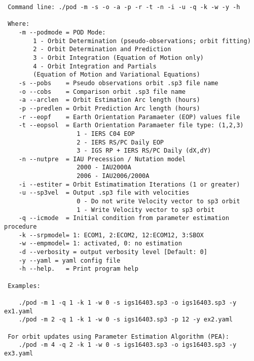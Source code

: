 \begin{verbatim}
 Command line: ./pod -m -s -o -a -p -r -t -n -i -u -q -k -w -y -h

 Where:
    -m --podmode = POD Mode:
        1 - Orbit Determination (pseudo-observations; orbit fitting)
        2 - Orbit Determination and Prediction
        3 - Orbit Integration (Equation of Motion only)
        4 - Orbit Integration and Partials 
        (Equation of Motion and Variational Equations)
    -s --pobs    = Pseudo observations orbit .sp3 file name
    -o --cobs    = Comparison orbit .sp3 file name
    -a --arclen  = Orbit Estimation Arc length (hours)
    -p --predlen = Orbit Prediction Arc length (hours)
    -r --eopf    = Earth Orientation Paramaeter (EOP) values file
    -t --eopsol  = Earth Orientation Paramaeter file type: (1,2,3)
                    1 - IERS C04 EOP
                    2 - IERS RS/PC Daily EOP
                    3 - IGS RP + IERS RS/PC Daily (dX,dY)
    -n --nutpre  = IAU Precession / Nutation model
                    2000 - IAU2000A
                    2006 - IAU2006/2000A
    -i --estiter = Orbit Estimatimation Iterations (1 or greater)
    -u --sp3vel  = Output .sp3 file with velocities
                    0 - Do not write Velocity vector to sp3 orbit
                    1 - Write Velocity vector to sp3 orbit
    -q --icmode  = Initial condition from parameter estimation procedure
    -k --srpmodel= 1: ECOM1, 2:ECOM2, 12:ECOM12, 3:SBOX
    -w --empmodel= 1: activated, 0: no estimation
    -d --verbosity = output verbosity level [Default: 0]
    -y --yaml = yaml config file
    -h --help.   = Print program help

 Examples:

    ./pod -m 1 -q 1 -k 1 -w 0 -s igs16403.sp3 -o igs16403.sp3 -y ex1.yaml
    ./pod -m 2 -q 1 -k 1 -w 0 -s igs16403.sp3 -p 12 -y ex2.yaml

 For orbit updates using Parameter Estimation Algorithm (PEA):
    ./pod -m 4 -q 2 -k 1 -w 0 -s igs16403.sp3 -o igs16403.sp3 -y ex3.yaml
\end{verbatim}

